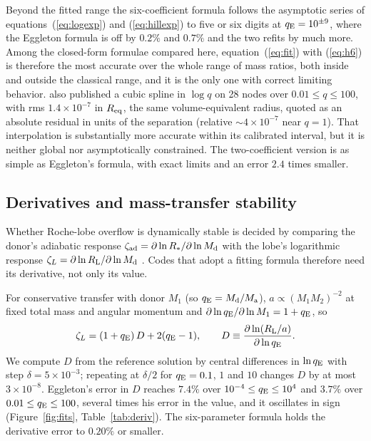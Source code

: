 \documentclass[twocolumn]{aastex702}
\newcommand{\qE}{q_{\rm E}}
\newcommand{\RL}{R_{\rm L}}
\begin{document}
Beyond the fitted range the six-coefficient formula follows the asymptotic series of equations~(\ref{eq:logexp}) and (\ref{eq:hillexp}) to five or six digits at $\qE=10^{\pm9}$, where the Eggleton formula is off by $0.2\%$ and $0.7\%$ and the two refits by much more. Among the closed-form formulae compared here, equation~(\ref{eq:fit}) with (\ref{eq:h6}) is therefore the most accurate over the whole range of mass ratios, both inside and outside the classical range, and it is the only one with correct limiting behavior. \citet{LeahyLeahy2015} also published a cubic spline in $\log q$ on 28 nodes over $0.01\le q\le100$, with rms $1.4\times10^{-7}$ in $R_{\rm eq}$, the same volume-equivalent radius, quoted as an absolute residual in units of the separation (relative $\sim4\times10^{-7}$ near $q=1$). That interpolation is substantially more accurate within its calibrated interval, but it is neither global nor asymptotically constrained. The two-coefficient version is as simple as Eggleton's formula, with exact limits and an error $2.4$ times smaller.

\subsection{Derivatives and mass-transfer stability}\label{sec:deriv}

Whether Roche-lobe overflow is dynamically stable is decided by comparing the donor's adiabatic response $\zeta_{\rm ad}=\partial\ln R_\ast/\partial\ln M_{\rm d}$ with the lobe's logarithmic response $\zeta_L=\partial\ln\RL/\partial\ln M_{\rm d}$ \citep{HjellmingWebbink1987,Soberman1997}. Codes that adopt a fitting formula therefore need its derivative, not only its value.

For conservative transfer with donor $M_1$ (so $\qE=M_{\rm d}/M_{\rm a}$), $a\propto(M_1M_2)^{-2}$ at fixed total mass and angular momentum and $\partial\ln\qE/\partial\ln M_1=1+\qE$, so
\begin{equation}
\zeta_L=(1+\qE)\,D+2(\qE-1),\qquad D\equiv\frac{\partial\ln(\RL/a)}{\partial\ln\qE}.
\label{eq:zetaL}
\end{equation}
We compute $D$ from the reference solution by central differences in $\ln\qE$ with step $\delta=5\times10^{-3}$; repeating at $\delta/2$ for $\qE=0.1$, $1$ and $10$ changes $D$ by at most $3\times10^{-8}$. Eggleton's error in $D$ reaches $7.4\%$ over $10^{-4}\le\qE\le10^4$ and $3.7\%$ over $0.01\le\qE\le100$, several times his error in the value, and it oscillates in sign (Figure~\ref{fig:fits}, Table~\ref{tab:deriv}). The six-parameter formula holds the derivative error to $0.20\%$ or smaller.
\end{document}
